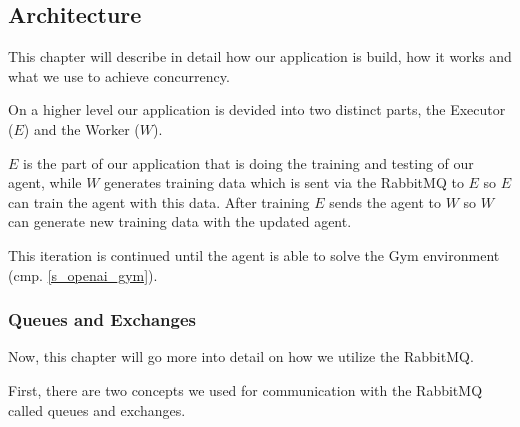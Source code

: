 \subsection{Architecture}

This chapter will describe in detail how our application
is build, how it works and what we use to achieve
concurrency.

On a higher level our application is devided into two
distinct parts, the Executor ($E$) and the Worker ($W$).

$E$ is the part of our application that is doing the
training and testing of our agent, while  $W$ generates
training data which is sent via the RabbitMQ to $E$ so $E$
can train the agent with this data. After training $E$
sends the agent to $W$ so $W$ can generate new training
data with the updated agent.

This iteration is continued until the agent is able to
solve the Gym environment (cmp. \ref{s_openai_gym}).







\subsubsection{Queues and Exchanges}

Now, this chapter will go more into detail on how we
utilize the RabbitMQ.

First, there are two concepts we used for communication
with the RabbitMQ called queues and exchanges.

